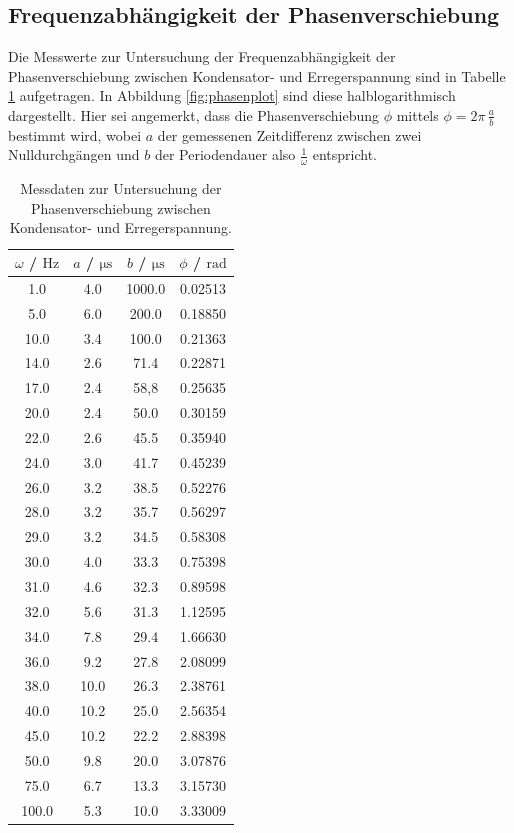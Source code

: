\subsection{Frequenzabhängigkeit der Phasenverschiebung}

Die Messwerte zur Untersuchung der Frequenzabhängigkeit der Phasenverschiebung zwischen Kondensator- und Erregerspannung sind in Tabelle \ref{tab:muh} aufgetragen.
In Abbildung \ref{fig:phasenplot} sind diese halblogarithmisch dargestellt.
Hier sei angemerkt, dass die Phasenverschiebung $\phi$ mittels $\phi = 2\pi \, \frac{a}{b}$ bestimmt wird, wobei $a$ der gemessenen Zeitdifferenz zwischen zwei Nulldurchgängen und $b$ der Periodendauer also $\frac{1}{\omega}$ entspricht.

\begin{table}
	\caption{Messdaten zur Untersuchung der Phasenverschiebung zwischen Kondensator- und Erregerspannung.}
	\centering
	\label{tab:muh}
	\begin{tabular}{cccc}
		\toprule
		$\omega$ / $\si{\Hz}$ & $a$ / $\si{\micro\second}$ & $b$ / $\si{\micro\second}$ & $\phi$ / $\si{\radian}$ \\
		\midrule
		1.0 & 4.0 & 1000.0 & 0.02513 \\
		5.0 & 6.0 & 200.0 & 0.18850 \\
		10.0 & 3.4 & 100.0 & 0.21363 \\
		14.0 & 2.6 & 71.4 & 0.22871 \\
		17.0 & 2.4 & 58,8 & 0.25635 \\
		20.0 & 2.4 & 50.0 & 0.30159 \\
		22.0 & 2.6 & 45.5 & 0.35940 \\
		24.0 & 3.0 & 41.7 & 0.45239 \\
		26.0 & 3.2 & 38.5 & 0.52276 \\
		28.0 & 3.2 & 35.7 & 0.56297 \\
		29.0 & 3.2 & 34.5 & 0.58308 \\
		30.0 & 4.0 & 33.3 & 0.75398 \\
		31.0 & 4.6 & 32.3 & 0.89598 \\
		32.0 & 5.6 & 31.3 & 1.12595 \\
		34.0 & 7.8 & 29.4 & 1.66630 \\
		36.0 & 9.2 & 27.8 & 2.08099 \\
		38.0 & 10.0 & 26.3 & 2.38761 \\
		40.0 & 10.2 & 25.0 & 2.56354 \\
		45.0 & 10.2 & 22.2 & 2.88398 \\
		50.0 & 9.8 & 20.0 & 3.07876 \\
		75.0 & 6.7 & 13.3 & 3.15730 \\
		100.0 & 5.3 & 10.0 & 3.33009 \\
	\bottomrule
	\end{tabular}
\end{table}



